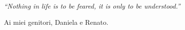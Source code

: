 
\begin{dedication} 

\textit{“Nothing in life is to be feared, it is only to be understood.”}\\

\vspace{50mm}

Ai miei genitori, Daniela e Renato.

\end{dedication}